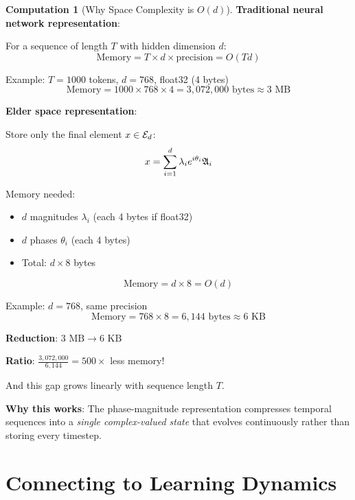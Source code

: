 \documentclass[12pt,a4paper]{article}
\theoremstyle{definition}
\newtheorem{computation}{Computation}[section]
\theoremstyle{remark}
\begin{document}
\begin{computation}[Why Space Complexity is $O(d)$]

\textbf{Traditional neural network representation}:

For a sequence of length $T$ with hidden dimension $d$:
$$\text{Memory} = T \times d \times \text{precision} = O(Td)$$

Example: $T=1000$ tokens, $d=768$, float32 (4 bytes)
$$\text{Memory} = 1000 \times 768 \times 4 = 3,072,000 \text{ bytes} \approx 3 \text{ MB}$$

\textbf{Elder space representation}:

Store only the final element $x \in \mathcal{E}_{d}$:
$$x = \sum_{i=1}^{d} \lambda_i e^{i\theta_i} \mathfrak{A}_{i}$$

Memory needed:
\begin{itemize}
\item $d$ magnitudes $\lambda_i$ (each 4 bytes if float32)
\item $d$ phases $\theta_i$ (each 4 bytes)
\item Total: $d \times 8$ bytes
\end{itemize}

$$\text{Memory} = d \times 8 = O(d)$$

Example: $d=768$, same precision
$$\text{Memory} = 768 \times 8 = 6,144 \text{ bytes} \approx 6 \text{ KB}$$

\textbf{Reduction}: $3 \text{ MB} \to 6 \text{ KB}$

\textbf{Ratio}: $\frac{3,072,000}{6,144} = 500\times$ less memory!

And this gap grows linearly with sequence length $T$.

\textbf{Why this works}: The phase-magnitude representation compresses temporal sequences into a \textit{single complex-valued state} that evolves continuously rather than storing every timestep.
\end{computation}

\newpage
\section{Connecting to Learning Dynamics}
\end{document}
